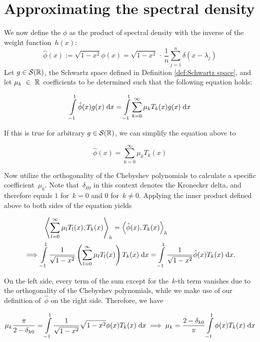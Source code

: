 \section{Approximating the spectral density}
We now define the $\hat{\phi}$ as the product of spectral density with the inverse of the weight function~$h(x)$:
\[
\hat{\phi}(x) := \sqrt{1 - x^2} \phi(x) = \sqrt{1 - x^2} \, \cdot \, \frac{1}{n} \sum_{j = 1}^n \delta(x - \lambda_j)
\]
Let $g \in \mathcal{S}(\mathbb{R})$, the Schwartz space defined in Definition \ref{def:Schwartz space}, and let $\mu_k~\in~\mathbb{R}$ coefficients to be determined such that the following equation holds:

\[
    \int \limits_{-1}^1 \hat{\phi}(x) g(x) \;\mathrm{d}x = \int \limits_{-1}^1 \sum_{k = 0}^{\infty} \mu_k T_k(x) g(x) \;\mathrm{d}x
\]

If this is true for arbitrary $g \in \mathcal{S}(\mathbb{R})$, we can simplify the equation above to

\begin{equation} \label{eq:Chebyshev-Expansion}
    \hat{\phi}(x) = \sum_{k = 0}^{\infty} \mu_k T_k(x)
\end{equation}


Now utilize the orthogonality of the Chebyshev polynomials to calculate a specific coefficient~$\mu_k$.
Note that~$\delta_{k0}$ in this context denotes the Kronecker delta, and therefore equals $1$ for~$k = 0$ and $0$ for~$k \neq 0$. Applying the inner product defined above to both sides of the equation yields

\begin{align*}
    & \; \; \left \langle \sum_{l = 0}^{\infty} \mu_l T_l(x), T_k(x) \right \rangle_h = \left \langle \hat{\phi}(x), T_k(x) \right \rangle_h \\
    \implies & \int\limits_{-1}^1 \frac{1}{\sqrt{1 - x^2}} \left(\sum_{l = 0}^{\infty} \mu_l T_l(x)\right) T_k(x) \;\mathrm{d}x = \int\limits_{-1}^1 \frac{1}{\sqrt{1 - x^2}} \hat{\phi}(x) T_k(x) \;\mathrm{d}x.\\
\end{align*}

On the left side, every term of the sum except for the~$k$-th term vanishes due to the orthogonality of the Chebyshev polynomials, while we make use of our definition of~$\hat{\phi}$ on the right side. Therefore, we have

\[
    \mu_k \frac{\pi}{2 - \delta_{k0}} = \int\limits_{-1}^1 \frac{1}{\sqrt{1 - x^2}} \sqrt{1 - x^2} \phi(x) T_k(x) \;\mathrm{d}x \implies \mu_k = \frac{2 - \delta_{k0}}{\pi} \int\limits_{-1}^1 \phi(x) T_k(x) \;\mathrm{d}x
\]

